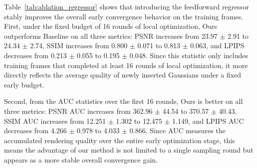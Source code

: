 \documentclass[lettersize,journal]{IEEEtran}
\begin{document}
\begin{table}[!t]
\centering
\caption{Feedforward regressor ablation on \texttt{hku\_campus\_00}.}
\label{tab:ablation_regressor}
\renewcommand{\arraystretch}{1.18}
\end{table}

Table~\ref{tab:ablation_regressor} shows that introducing the feedforward regressor stably improves the overall early convergence behavior on the training frames. First, under the fixed budget of 16 rounds of local optimization, Ours outperforms Baseline on all three metrics: PSNR increases from 23.97 $\pm$ 2.91 to 24.34 $\pm$ 2.74, SSIM increases from 0.800 $\pm$ 0.071 to 0.813 $\pm$ 0.063, and LPIPS decreases from 0.213 $\pm$ 0.055 to 0.195 $\pm$ 0.048. Since this statistic only includes training frames that completed at least 16 rounds of local optimization, it more directly reflects the average quality of newly inserted Gaussians under a fixed early budget.

Second, from the AUC statistics over the first 16 rounds, Ours is better on all three metrics: PSNR AUC increases from 362.96 $\pm$ 44.54 to 370.57 $\pm$ 40.43, SSIM AUC increases from 12.251 $\pm$ 1.302 to 12.475 $\pm$ 1.149, and LPIPS AUC decreases from 4.266 $\pm$ 0.978 to 4.033 $\pm$ 0.866. Since AUC measures the accumulated rendering quality over the entire early optimization stage, this means the advantage of our method is not limited to a single sampling round but appears as a more stable overall convergence gain.
\end{document}
